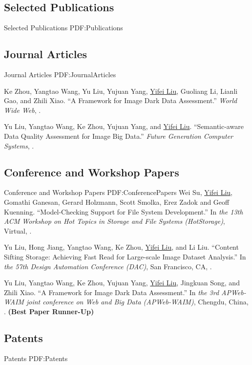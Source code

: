 \documentclass[letterpaper,10pt,oneside]{article}
\begin{document}
\begin{body}

\section
{Selected Publications}
{Selected Publications}
{PDF:Publications}

\subsection
{Journal Articles}
{Journal Articles}
{PDF:JournalArticles}

\NumberedItem{[1]}
Ke Zhou, Yangtao Wang, Yu Liu, Yujuan Yang, \underline{Yifei Liu}, Guoliang Li, Lianli Gao, and Zhili Xiao.
``A Framework for Image Dark Data Assessment.'' 
\textit{World Wide Web},
.

\NumberedItem{[2]}
Yu Liu, Yangtao Wang, Ke Zhou, Yujuan Yang, and \underline{Yifei Liu}.
``Semantic-aware Data Quality Assessment for Image Big Data.'' 
\textit{Future Generation Computer Systems},
.

\subsection
{Conference and Workshop Papers}
{Conference and Workshop Papers}
{PDF:ConferencePapers}
\NumberedItem{[1]}
Wei Su, \underline{Yifei Liu}, Gomathi Ganesan, Gerard Holzmann, Scott Smolka, Erez Zadok and Geoff Kuenning.
``Model-Checking Support for File System Development.''
In \textit{the 13th ACM Workshop on Hot Topics in Storage and File Systems (HotStorage)}, Virtual,
.

\NumberedItem{[2]}
Yu Liu, Hong Jiang, Yangtao Wang, Ke Zhou, \underline{Yifei Liu}, and Li Liu.
``Content Sifting Storage: Achieving Fast Read for Large-scale Image Dataset Analysis.''
In \textit{the 57th Design Automation Conference (DAC)}, San Francisco, CA,
.

\NumberedItem{[3]}
Yu Liu, Yangtao Wang, Ke Zhou, Yujuan Yang, \underline{Yifei Liu}, Jingkuan Song, and Zhili Xiao.
``A Framework for Image Dark Data Assessment.''
In \textit{the 3rd APWeb-WAIM joint conference on Web and Big Data (APWeb-WAIM)}, Chengdu, China,
. \textbf{(Best Paper Runner-Up)}

\subsection
{Patents}
{Patents}
{PDF:Patents}


\end{body}
\end{document}
